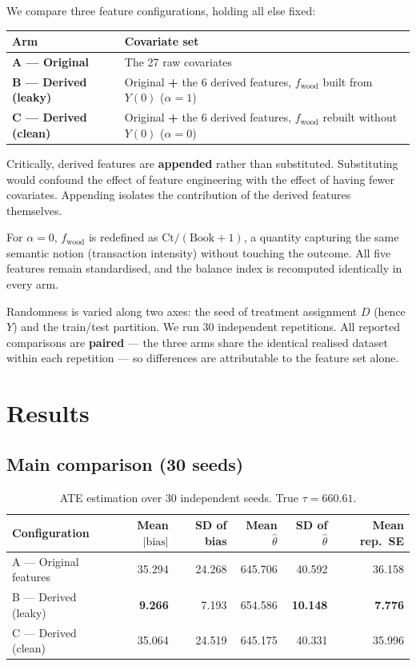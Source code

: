 \documentclass[11pt]{article}
\begin{document}
We compare three feature configurations, holding all else fixed:

\begin{center}
\begin{tabular}{ll}
\toprule
Arm & Covariate set \\
\midrule
\textbf{A --- Original} & The 27 raw covariates \\
\textbf{B --- Derived (leaky)} & Original \textbf{+} the 6 derived features, $f_{\text{wood}}$ built from $Y(0)$ ($\alpha = 1$) \\
\textbf{C --- Derived (clean)} & Original \textbf{+} the 6 derived features, $f_{\text{wood}}$ rebuilt without $Y(0)$ ($\alpha = 0$) \\
\bottomrule
\end{tabular}
\end{center}

Critically, derived features are \textbf{appended} rather than substituted. Substituting would confound the effect of feature engineering with the effect of having fewer covariates. Appending isolates the contribution of the derived features themselves.

For $\alpha = 0$, $f_{\text{wood}}$ is redefined as $\text{Ct} / (\text{Book} + 1)$, a quantity capturing the same semantic notion (transaction intensity) without touching the outcome. All five features remain standardised, and the balance index is recomputed identically in every arm.

Randomness is varied along two axes: the seed of treatment assignment $D$ (hence $Y$) and the train/test partition. We run 30 independent repetitions. All reported comparisons are \textbf{paired} --- the three arms share the identical realised dataset within each repetition --- so differences are attributable to the feature set alone.

\section{Results}

\subsection{Main comparison (30 seeds)}

\begin{table}[htbp]
\centering
\caption{ATE estimation over 30 independent seeds. True $\tau = 660.61$.}
\label{tab:main}
\begin{tabular}{lrrrrr}
\toprule
Configuration & Mean $|\text{bias}|$ & SD of bias & Mean $\hat\theta$ & SD of $\hat\theta$ & Mean rep.\ SE \\
\midrule
A --- Original features & 35.294 & 24.268 & 645.706 & 40.592 & 36.158 \\
B --- Derived (leaky) & \textbf{9.266} & 7.193 & 654.586 & \textbf{10.148} & \textbf{7.776} \\
C --- Derived (clean) & 35.064 & 24.519 & 645.175 & 40.331 & 35.996 \\
\bottomrule
\end{tabular}
\end{table}
\end{document}
